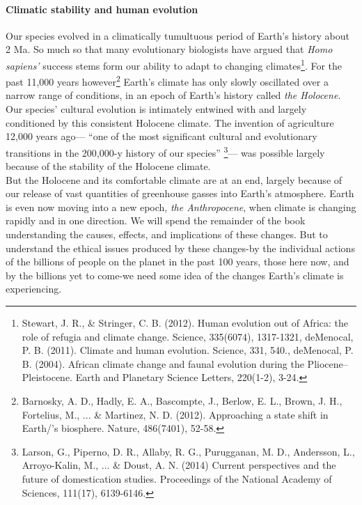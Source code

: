 \documentclass[amstex,12pt]{book}
\begin{document}
\paragraph{Climatic stability and human evolution}
Our species evolved in a climatically tumultuous period of Earth's history about 2 Ma. So much so that many evolutionary biologists have argued that \textit{Homo sapiens'} success stems form our ability to adapt to changing climates\footnote{Stewart, J. R., \& Stringer, C. B. (2012). Human evolution out of Africa: the role of refugia and climate change. Science, 335(6074), 1317-1321, deMenocal, P. B. (2011). Climate and human evolution. Science, 331, 540., deMenocal, P. B. (2004). African climate change and faunal evolution during the Pliocene–Pleistocene. Earth and Planetary Science Letters, 220(1-2), 3-24.}. For the past 11,000 years however\footnote{Barnosky, A. D., Hadly, E. A., Bascompte, J., Berlow, E. L., Brown, J. H., Fortelius, M., ... \& Martinez, N. D. (2012). Approaching a state shift in Earth/'s biosphere. Nature, 486(7401), 52-58.} Earth's climate has only slowly oscillated over a narrow range of conditions, in an epoch of Earth's history called \emph{the Holocene}. Our species' cultural evolution is intimately entwined with and largely conditioned by this consistent Holocene climate. The invention of agriculture 12,000 years ago--- ``one of the most significant cultural and evolutionary transitions in the 200,000-y history of our species'' \footnote{Larson, G., Piperno, D. R., Allaby, R. G., Purugganan, M. D., Andersson, L., Arroyo-Kalin, M., ... \& Doust, A. N. (2014) Current perspectives and the future of domestication studies. Proceedings of the National Academy of Sciences, 111(17), 6139-6146.}--- was possible largely because of the stability of the Holocene climate.\\

But the Holocene and its comfortable climate are at an end, largely because of our release of vast quantities of greenhouse gasses into Earth's atmosphere. Earth is even now moving into a new epoch, \emph{the Anthropocene}, when climate is changing rapidly and in one direction. We will spend the remainder of the book understanding the causes, effects, and implications of these changes. But to understand the ethical issues produced by these changes-by the individual actions of the billions of people on the planet in the past 100 years, those here now, and by the billions yet to come-we need some idea of the changes Earth's climate is experiencing.
\end{document}
